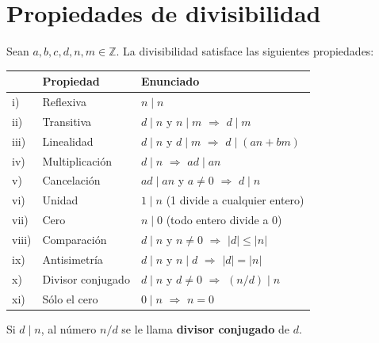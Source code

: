 \documentclass[12pt,a4paper]{book}
\begin{document}
  \section{Propiedades de divisibilidad}
  
  Sean $a,b,c,d,n,m \in \mathbb{Z}$. La divisibilidad satisface las siguientes propiedades:
  
  \begin{center}
    \begin{tabular}{lll}
      \toprule
            & \textbf{Propiedad} & \textbf{Enunciado}                                  \\
      \midrule
      i)    & Reflexiva          & $n \mid n$                                          \\
      ii)   & Transitiva         & $d\mid n$ y $n\mid m$ $\Rightarrow$ $d\mid m$       \\
      iii)  & Linealidad         & $d\mid n$ y $d\mid m$ $\Rightarrow$ $d\mid (an+bm)$ \\
      iv)   & Multiplicación     & $d\mid n$ $\Rightarrow$ $ad\mid an$                 \\
      v)    & Cancelación        & $ad\mid an$ y $a\neq 0$ $\Rightarrow$ $d\mid n$     \\
      vi)   & Unidad             & $1\mid n$ \quad (1 divide a cualquier entero)       \\
      vii)  & Cero               & $n\mid 0$ \quad (todo entero divide a 0)            \\
      viii) & Comparación        & $d\mid n$ y $n\neq 0$ $\Rightarrow$ $|d|\leq |n|$   \\
      ix)   & Antisimetría       & $d\mid n$ y $n\mid d$ $\Rightarrow$ $|d|=|n|$       \\
      x)    & Divisor conjugado  & $d\mid n$ y $d\neq 0$ $\Rightarrow$ $(n/d)\mid n$   \\
      xi)   & Sólo el cero       & $0\mid n$ $\Rightarrow$ $n=0$                       \\
      \bottomrule
    \end{tabular}
  \end{center}
  
  \begin{definicion}
    Si $d\mid n$, al número $n/d$ se le llama \textbf{divisor conjugado} de $d$.
  \end{definicion}
  
\end{document}
